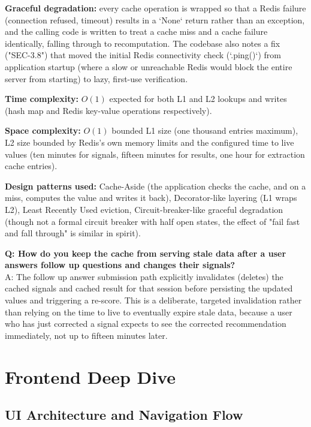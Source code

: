 \documentclass[11pt,a4paper]{report}
\begin{document}
\textbf{Graceful degradation:} every cache operation is wrapped so that a Redis failure (connection refused, timeout) results in a `None` return rather than an exception, and the calling code is written to treat a cache miss and a cache failure identically, falling through to recomputation. The codebase also notes a fix ("SEC-3.8") that moved the initial Redis connectivity check (`.ping()`) from application startup (where a slow or unreachable Redis would block the entire server from starting) to lazy, first-use verification.

\textbf{Time complexity:} $O(1)$ expected for both L1 and L2 lookups and writes (hash map and Redis key-value operations respectively).

\textbf{Space complexity:} $O(1)$ bounded L1 size (one thousand entries maximum), L2 size bounded by Redis's own memory limits and the configured time to live values (ten minutes for signals, fifteen minutes for results, one hour for extraction cache entries).

\textbf{Design patterns used:} Cache-Aside (the application checks the cache, and on a miss, computes the value and writes it back), Decorator-like layering (L1 wraps L2), Least Recently Used eviction, Circuit-breaker-like graceful degradation (though not a formal circuit breaker with half open states, the effect of "fail fast and fall through" is similar in spirit).

\begin{qabox}
\textbf{Q: How do you keep the cache from serving stale data after a user answers follow up questions and changes their signals?} \\
A: The follow up answer submission path explicitly invalidates (deletes) the cached signals and cached result for that session before persisting the updated values and triggering a re-score. This is a deliberate, targeted invalidation rather than relying on the time to live to eventually expire stale data, because a user who has just corrected a signal expects to see the corrected recommendation immediately, not up to fifteen minutes later.
\end{qabox}

\chapter{Frontend Deep Dive}

\section{UI Architecture and Navigation Flow}
\end{document}
